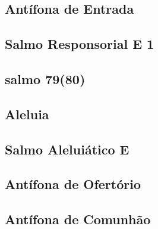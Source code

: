\subsection{Antífona de Entrada}\label{subsection:tempus-adventus/missa-1/introitus}

\subsection[Salmo Responsorial]{Salmo Responsorial \textmd{E 1}}\label{subsection:tempus-adventus/missa-1/psalmus-responsorius}
\subsection{salmo 79(80)}

\AllowPageFlush

\subsection{Aleluia}\label{subsection:tempus-adventus/missa-1/alleluia}

\AllowPageFlush

\subsection[Salmo Aleluiático]{Salmo Aleluiático \textmd{E \protect\GreStar}}\label{subsection:tempus-adventus/missa-1/psalmus-alleluiaticus}

\AllowPageFlush

\subsection{Antífona de Ofertório}\label{subsection:tempus-adventus/missa-1/offertorium}

\AllowPageFlush

\subsection{Antífona de Comunhão}\label{subsection:tempus-adventus/missa-1/communio}

\AllowPageFlush